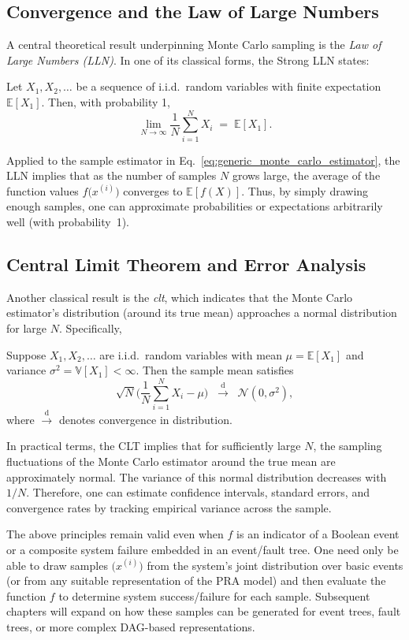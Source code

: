 \subsection{Convergence and the Law of Large Numbers}
A central theoretical result underpinning Monte Carlo sampling is the \emph{Law of Large Numbers (LLN)}. In one of its classical forms, the Strong LLN states:
\begin{theorem}
\label{thm:SLLN}
Let \(X_1, X_2, \dots\) be a sequence of i.i.d.\ random variables with finite expectation \(\mathbb{E}[X_1]\). Then, with probability 1,
\[
\lim_{N\to\infty}
\frac{1}{N}\sum_{i=1}^N X_i
\;=\;
\mathbb{E}[X_1].
\]
\end{theorem}
Applied to the sample estimator in Eq.~\eqref{eq:generic_monte_carlo_estimator}, the LLN implies that as the number of samples \(N\) grows large, the average of the function values \(f\bigl(x^{(i)}\bigr)\) converges to \(\mathbb{E}[f(X)]\). Thus, by simply drawing enough samples, one can approximate probabilities or expectations arbitrarily well (with probability~1).

\subsection{Central Limit Theorem and Error Analysis}
Another classical result is the \emph{\acrfull{clt}}, which indicates that the Monte Carlo estimator’s distribution (around its true mean) approaches a normal distribution for large \(N\). Specifically,

\begin{theorem}
\label{thm:CLT}
Suppose \(X_1, X_2,\dots\) are i.i.d.\ random variables with mean \(\mu=\mathbb{E}[X_1]\) and variance \(\sigma^2=\mathbb{V}[X_1]<\infty\). Then the sample mean satisfies
\[
\sqrt{N}
\biggl(
 \frac{1}{N}\sum_{i=1}^N X_i - \mu
\biggr)
\;\;\xrightarrow{\mathrm{d}}\;\;
\mathcal{N}(0,\sigma^2),
\]
where \(\xrightarrow{\mathrm{d}}\) denotes convergence in distribution.
\end{theorem}

In practical terms, the CLT implies that for sufficiently large \(N\), the sampling fluctuations of the Monte Carlo estimator around the true mean are approximately normal. The variance of this normal distribution decreases with \(1/N\). Therefore, one can estimate confidence intervals, standard errors, and convergence rates by tracking empirical variance across the sample.

The above principles remain valid even when \(f\) is an indicator of a Boolean event or a composite system failure embedded in an event/fault tree. One need only be able to draw samples \(\bigl(x^{(i)}\bigr)\) from the system’s joint distribution over basic events (or from any suitable representation of the PRA model) and then evaluate the function \(f\) to determine system success/failure for each sample. Subsequent chapters will expand on how these samples can be generated for event trees, fault trees, or more complex DAG-based representations.

